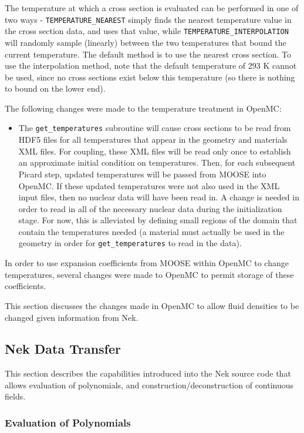 \documentclass[10pt]{article}
\newcounter{subsubsubsection}[subsubsection]
\numberwithin{equation}{section} %
\begin{document}
The temperature at which a cross section is evaluated can be performed in one of two ways - {\tt TEMPERATURE\_NEAREST} simply finds the nearest temperature value in the cross section data, and uses that value, while {\tt TEMPERATURE\_INTERPOLATION} will randomly sample (linearly) between the two temperatures that bound the current temperature. The default method is to use the nearest cross section. To use the interpolation method, note that the default temperature of 293 K cannot be used, since no cross sections exist below this temperature (so there is nothing to bound on the lower end).

The following changes were made to the temperature treatment in OpenMC:

\begin{itemize}
\item The {\tt get\_temperatures} subroutine will cause cross sections to be read from HDF5 files for all temperatures that appear in the geometry and materials XML files. For coupling, these XML files will be read only once to establish an approximate initial condition on temperatures. Then, for each subsequent Picard step, updated temperatures will be passed from MOOSE into OpenMC. If these updated temperatures were not also used in the XML input files, then no nuclear data will have been read in. A change is needed in order to read in all of the necessary nuclear data during the initialization stage. For now, this is alleviated by defining small regions of the domain that contain the temperatures needed (a material must actually be used in the geometry in order for {\tt get\_temperatures} to read in the data).
\end{itemize}

In order to use expansion coefficients from MOOSE within OpenMC to change temperatures, several changes were made to OpenMC to permit storage of these coefficients. 

This section discusses the changes made in OpenMC to allow fluid densities to be changed given information from Nek. 

\subsection{Nek Data Transfer}
This section describes the capabilities introduced into the Nek source code that allows evaluation of polynomials, and construction/deconstruction of continuous fields. 

\subsubsection{Evaluation of Polynomials}
\end{document}
